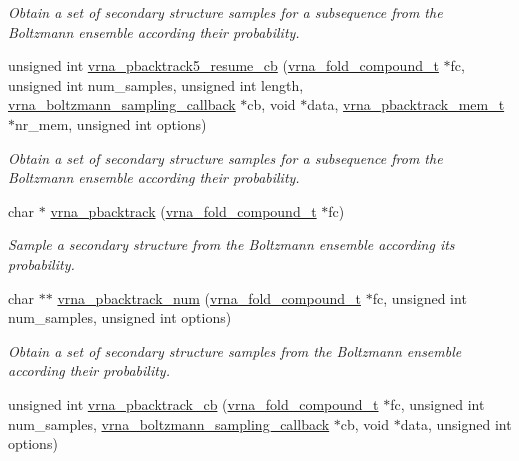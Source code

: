 \begin{DoxyCompactItemize}
\begin{DoxyCompactList}\small\item\em Obtain a set of secondary structure samples for a subsequence from the Boltzmann ensemble according their probability. \end{DoxyCompactList}\item 
unsigned int \mbox{\hyperlink{group__subopt__stochbt_ga4a91dc092580faf7799476e8dd76e0ac}{vrna\+\_\+pbacktrack5\+\_\+resume\+\_\+cb}} (\mbox{\hyperlink{group__fold__compound_ga1b0cef17fd40466cef5968eaeeff6166}{vrna\+\_\+fold\+\_\+compound\+\_\+t}} $\ast$fc, unsigned int num\+\_\+samples, unsigned int length, \mbox{\hyperlink{group__subopt__stochbt_gad5bd9c8b195dd9cde15389f0042f0e44}{vrna\+\_\+boltzmann\+\_\+sampling\+\_\+callback}} $\ast$cb, void $\ast$data, \mbox{\hyperlink{group__subopt__stochbt_gaa59c30efbed96bf9aaf8005584c72e63}{vrna\+\_\+pbacktrack\+\_\+mem\+\_\+t}} $\ast$nr\+\_\+mem, unsigned int options)
\begin{DoxyCompactList}\small\item\em Obtain a set of secondary structure samples for a subsequence from the Boltzmann ensemble according their probability. \end{DoxyCompactList}\item 
char $\ast$ \mbox{\hyperlink{group__subopt__stochbt_ga594844ac73c4e66e00d6791b31540634}{vrna\+\_\+pbacktrack}} (\mbox{\hyperlink{group__fold__compound_ga1b0cef17fd40466cef5968eaeeff6166}{vrna\+\_\+fold\+\_\+compound\+\_\+t}} $\ast$fc)
\begin{DoxyCompactList}\small\item\em Sample a secondary structure from the Boltzmann ensemble according its probability. \end{DoxyCompactList}\item 
char $\ast$$\ast$ \mbox{\hyperlink{group__subopt__stochbt_ga596ed9bcd86f629a7c7c59c58b297db5}{vrna\+\_\+pbacktrack\+\_\+num}} (\mbox{\hyperlink{group__fold__compound_ga1b0cef17fd40466cef5968eaeeff6166}{vrna\+\_\+fold\+\_\+compound\+\_\+t}} $\ast$fc, unsigned int num\+\_\+samples, unsigned int options)
\begin{DoxyCompactList}\small\item\em Obtain a set of secondary structure samples from the Boltzmann ensemble according their probability. \end{DoxyCompactList}\item 
unsigned int \mbox{\hyperlink{group__subopt__stochbt_ga843fa953a15337b15cc68401adad84d7}{vrna\+\_\+pbacktrack\+\_\+cb}} (\mbox{\hyperlink{group__fold__compound_ga1b0cef17fd40466cef5968eaeeff6166}{vrna\+\_\+fold\+\_\+compound\+\_\+t}} $\ast$fc, unsigned int num\+\_\+samples, \mbox{\hyperlink{group__subopt__stochbt_gad5bd9c8b195dd9cde15389f0042f0e44}{vrna\+\_\+boltzmann\+\_\+sampling\+\_\+callback}} $\ast$cb, void $\ast$data, unsigned int options)
$$
\end{DoxyCompactItemize}
